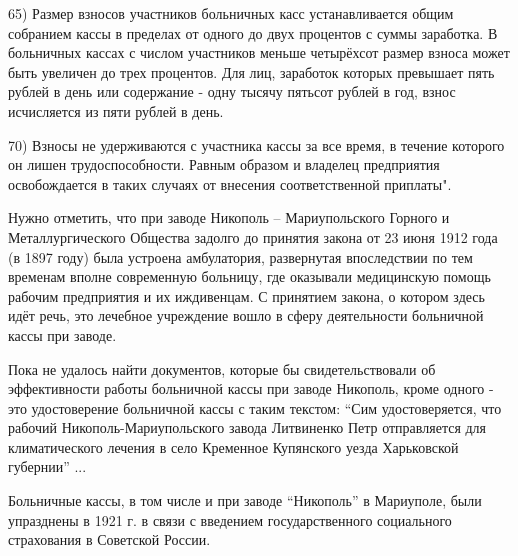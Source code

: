 65) Размер взносов участников больничных касс устанавливается общим собранием
кассы в пределах от одного до двух процентов с суммы заработка. В больничных
кассах с числом участников меньше четырёхсот размер взноса может быть увеличен
до трех процентов. Для лиц, заработок которых превышает пять рублей в день или
содержание - одну тысячу пятьсот рублей в год, взнос исчисляется из пяти рублей
в день.

70) Взносы не удерживаются с участника кассы за все время, в течение которого
он лишен трудоспособности. Равным образом и владелец предприятия освобождается
в таких случаях от внесения соответственной приплаты".

Нужно отметить, что при заводе Никополь – Мариупольского Горного и
Металлургического Общества задолго до принятия закона от 23 июня 1912 года (в
1897 году) была устроена амбулатория, развернутая впоследствии по тем временам
вполне современную больницу, где оказывали медицинскую помощь рабочим
предприятия и их иждивенцам. С принятием закона, о котором здесь идёт речь, это
лечебное учреждение вошло в сферу деятельности больничной кассы при заводе.

Пока не удалось найти документов, которые бы свидетельствовали об эффективности
работы больничной кассы при заводе Никополь, кроме одного - это удостоверение
больничной кассы с таким текстом: \enquote{Сим удостоверяется, что рабочий
Никополь-Мариупольского завода Литвиненко Петр отправляется для климатического
лечения в село Кременное Купянского уезда Харьковской губернии} ...

Больничные кассы, в том числе и при заводе \enquote{Никополь} в Мариуполе, были
упразднены в 1921 г. в связи с введением государственного социального
страхования в Советской России.
